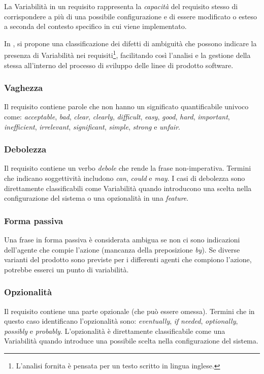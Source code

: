 \documentclass[12pt]{report}
\begin{document}
\begin{mdframed}
\small
La \textsf{Variabilità} in un requisito rappresenta la \textit{capacità} del requisito stesso di corrispondere a più di una possibile configurazione e di essere modificato o esteso a seconda del contesto specifico in cui viene implementato.
\end{mdframed}

In \cite{oai:it.cnr:prodotti:458001}, si propone una classificazione dei difetti di ambiguità che possono indicare la presenza di Variabilità nei requisiti\footnote{L’analisi fornita è pensata per un testo scritto in lingua inglese.}, facilitando così l'analisi e la gestione della stessa all'interno del processo di sviluppo delle linee di prodotto software.


\subsubsection{Vaghezza}
Il requisito contiene parole che non hanno un significato quantificabile univoco come: \textit{acceptable}, \textit{bad}, \textit{clear}, \textit{clearly}, \textit{difficult}, \textit{easy}, \textit{good}, \textit{hard}, \textit{important}, \textit{inefficient}, \textit{irrelevant}, \textit{significant}, \textit{simple}, \textit{strong} e \textit{unfair}.


\subsubsection{Debolezza}
Il requisito contiene un verbo \textit{debole} che rende la frase non-imperativa. Termini che indicano soggettività includono \textit{can}, \textit{could} e \textit{may}. I casi di debolezza sono direttamente classificabili come Variabilità quando introducono una scelta nella configurazione del sistema o una opzionalità in una \textit{feature}.


\subsubsection{Forma passiva}
Una frase in forma passiva è considerata ambigua se non ci sono indicazioni dell'agente che compie l'azione (mancanza della preposizione \textit{by}). Se diverse varianti del prodotto sono previste per i differenti agenti che compiono l'azione, potrebbe esserci un punto di variabilità.


\subsubsection{Opzionalità}
Il requisito contiene una parte opzionale (che può essere omessa). Termini che in questo caso identificano l'opzionalità sono: \textit{eventually}, \textit{if} \textit{needed}, \textit{optionally}, \textit{possibly} e \textit{probably}. L'opzionalità è direttamente classificabile come una Variabilità quando introduce una possibile scelta nella configurazione del sistema.
\end{document}
